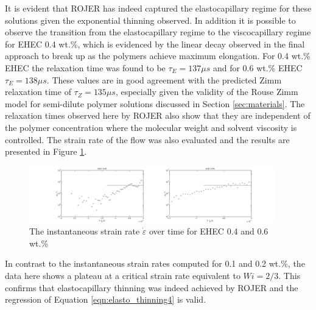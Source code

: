 \documentclass[11pt]{article}
\begin{document}
It is evident that ROJER has indeed captured the elastocapillary regime for these solutions given the exponential thinning observed. In addition it is possible to observe the transition from the elastocapillary regime to the viscocapillary regime for EHEC 0.4 wt.\%, which is evidenced by the linear decay observed in the final approach to break up as the polymers achieve maximum elongation. For 0.4 wt.\% EHEC the relaxation time was found to be $\tau_E = 137 \mu s$ and for 0.6 wt.\% EHEC $\tau_E = 138 \mu s$. These values are in good agreement with the predicted Zimm relaxation time of $\tau_{Z} = 135 \mu s$, especially given the validity of the Rouse Zimm model for semi-dilute polymer solutions discussed in Section \ref{sec:materials}. The relaxation times observed here by ROJER also show that they are independent of the polymer concentration where the molecular weight and solvent viscosity is controlled. The strain rate of the flow was also evaluated and the results 
are presented in Figure \ref{fig:4_6_EHEC_strain}.
\begin{figure}[H]
	\begin{center}
		\includegraphics[width=0.95\textwidth, trim = 7cm 0cm 6cm 0cm]{img/4_6_EHEC_strain.png}
		\caption{The instantaneous strain rate $\dot{\varepsilon}$ over time for EHEC 0.4 and 0.6 wt.\%}
		\label{fig:4_6_EHEC_strain}
	\end{center}
\end{figure}

In contrast to the instantaneous strain rates computed for 0.1 and 0.2 wt.\%, the data here shows a plateau at a critical strain rate equivalent to $Wi = 2/3$. This confirms that elastocapillary thinning was indeed achieved by ROJER and the regression of Equation \ref{eqn:elasto_thinning4} is valid.
\end{document}
